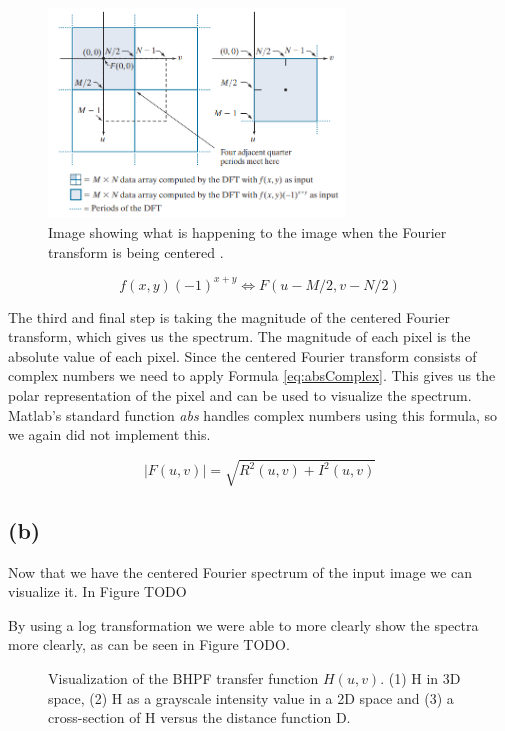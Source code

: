 \documentclass{article}
\begin{document}
\begin{figure}[h]
    \centering
    \includegraphics[width=0.7\textwidth]{Assignment_2/output_plots/centered_fourier_spectrum_book.png}
    \caption{Image showing what is happening to the image when the Fourier transform is being centered \cite{gonzalez2008digital}.}
    \label{fig:fouriershiftFromBook}
\end{figure}

\begin{equation}\label{eq:fouriershift}
    f(x, y)(-1)^{x+y} \Leftrightarrow F(u-M / 2, v-N / 2)
\end{equation}

The third and final step is taking the magnitude of the centered Fourier transform, which gives us the spectrum. The magnitude of each pixel is the absolute value of each pixel. Since the centered Fourier transform consists of complex numbers we need to apply Formula \ref{eq:absComplex}. This gives us the polar representation of the pixel and can be used to visualize the spectrum. Matlab's standard function \textit{abs} handles complex numbers using this formula, so we again did not implement this.

\begin{equation}\label{eq:absComplex}
    |F(u, v)|=\sqrt{R^{2}(u, v)+I^{2}(u, v)}
\end{equation}

\subsection{(b)}
Now that we have the centered Fourier spectrum of the input image we can visualize it. In Figure TODO

By using a log transformation we were able to more clearly show the spectra more clearly, as can be seen in Figure TODO.

\begin{figure}[h]
    \centering
    
    \caption{Visualization of the BHPF transfer function $H(u, v)$. (1) H in 3D space, (2) H as a grayscale intensity value in a 2D space and (3) a cross-section of H versus the distance function D.}
    \label{fig:bhpf}
\end{figure}
\end{document}
